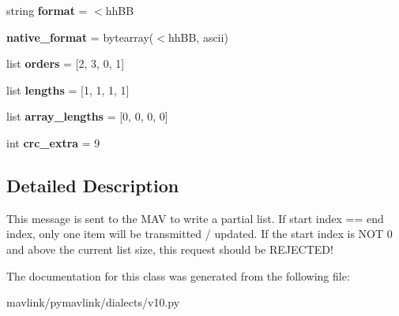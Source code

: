 \begin{DoxyCompactItemize}
string {\bfseries format} = \textquotesingle{}$<$hh\+BB\textquotesingle{}
\item 
\mbox{\label{classpymavlink_1_1dialects_1_1v10_1_1MAVLink__mission__write__partial__list__message_a24da34cefb0637169eb14c5875865b0a}} 
{\bfseries native\+\_\+format} = bytearray(\textquotesingle{}$<$hh\+BB\textquotesingle{}, \textquotesingle{}ascii\textquotesingle{})
\item 
\mbox{\label{classpymavlink_1_1dialects_1_1v10_1_1MAVLink__mission__write__partial__list__message_a8d33f86ae5b257775bb999a50b28e178}} 
list {\bfseries orders} = \mbox{[}2, 3, 0, 1\mbox{]}
\item 
\mbox{\label{classpymavlink_1_1dialects_1_1v10_1_1MAVLink__mission__write__partial__list__message_a3a27a52ec14bcc0f7cfe6df275a59829}} 
list {\bfseries lengths} = \mbox{[}1, 1, 1, 1\mbox{]}
\item 
\mbox{\label{classpymavlink_1_1dialects_1_1v10_1_1MAVLink__mission__write__partial__list__message_a2d586a9d7210bc758438931cc08d4d84}} 
list {\bfseries array\+\_\+lengths} = \mbox{[}0, 0, 0, 0\mbox{]}
\item 
\mbox{\label{classpymavlink_1_1dialects_1_1v10_1_1MAVLink__mission__write__partial__list__message_ac4bdf826867e56e8eda55b541d588e07}} 
int {\bfseries crc\+\_\+extra} = 9
\end{DoxyCompactItemize}


\subsection{Detailed Description}
\begin{DoxyVerb}This message is sent to the MAV to write a partial list. If
start index == end index, only one item will be transmitted /
updated. If the start index is NOT 0 and above the current
list size, this request should be REJECTED!
\end{DoxyVerb}
 

The documentation for this class was generated from the following file\+:\begin{DoxyCompactItemize}
\item 
mavlink/pymavlink/dialects/v10.\+py\end{DoxyCompactItemize}
